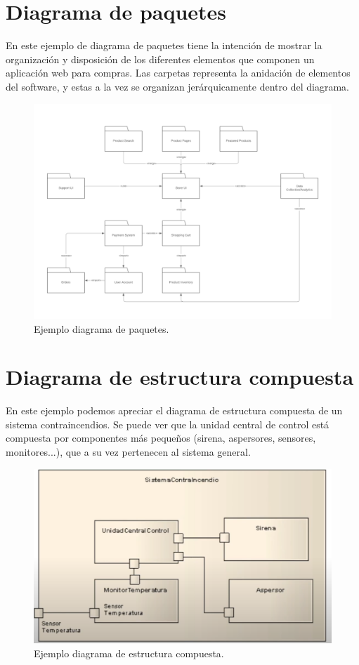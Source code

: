 \documentclass[a4paper, 12pt]{book}
\begin{document}
\section{Diagrama de paquetes}
En este ejemplo de diagrama de paquetes tiene la intención de mostrar la organización y disposición de los diferentes elementos que componen un aplicación web para compras. Las carpetas representa la anidación de elementos del software, y estas a la vez se organizan jerárquicamente dentro del diagrama. 
\begin{figure}
	\centering
	\includegraphics[width=14cm, keepaspectratio]{img/diagrama_paquetes.png}
	\caption{Ejemplo diagrama de paquetes.}\label{fig:diagrama_paquetes}
\end{figure}

\section{Diagrama de estructura compuesta}
En este ejemplo podemos apreciar el diagrama de estructura compuesta de un sistema contraincendios. Se puede ver que la unidad central de control está compuesta por componentes más pequeños (sirena, aspersores, sensores, monitores...), que a su vez pertenecen al sistema general.
\begin{figure}
	\centering
	\includegraphics[width=12cm, keepaspectratio]{img/diagrama_estructura_compuesta.png}
	\caption{Ejemplo diagrama de estructura compuesta.}\label{fig:diagrama_estructura_compuesta}
\end{figure}
\end{document}
